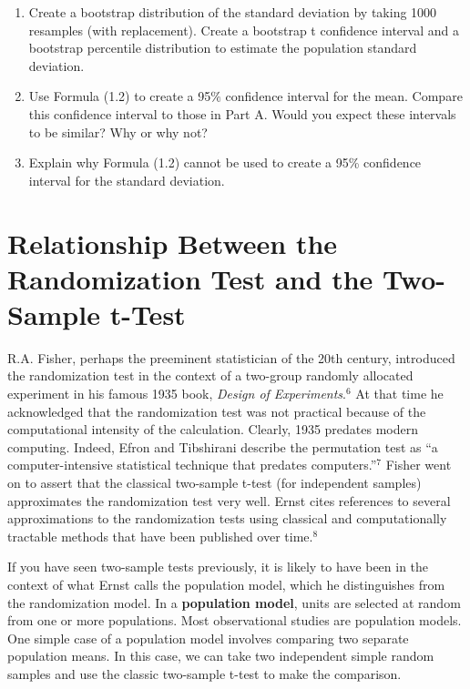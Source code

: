\documentclass[
]{book}
\providecommand{\tightlist}{%
  \setlength{\itemsep}{0pt}\setlength{\parskip}{0pt}}
\begin{document}
\begin{enumerate}
\def\labelenumi{\alph{enumi}.}
\tightlist
\item
  Create a bootstrap distribution of the standard deviation by taking 1000 resamples (with replacement). Create a bootstrap t confidence interval and a bootstrap percentile distribution to estimate the population standard deviation.
\item
  Use Formula (1.2) to create a 95\(\%\) confidence interval for the mean. Compare this confidence interval to those in Part A. Would you expect these intervals to be similar? Why or why not?
\item
  Explain why Formula (1.2) cannot be used to create a 95\% confidence interval for the standard deviation.
\end{enumerate}

\hypertarget{relationship-between-the-randomization-test-and-the-two-sample-t-test}{%
\section{Relationship Between the Randomization Test and the Two-Sample t-Test}\label{relationship-between-the-randomization-test-and-the-two-sample-t-test}}

R.A. Fisher, perhaps the preeminent statistician of the 20th century, introduced the randomization test in the context of a two-group randomly allocated experiment in his famous 1935 book, \emph{Design of Experiments}.\(^6\) At that time he acknowledged that the randomization test was not practical because of the computational
intensity of the calculation. Clearly, 1935 predates modern computing. Indeed, Efron and Tibshirani describe the permutation test as ``a computer-intensive statistical technique that predates computers.''\(^7\) Fisher went on to assert that the classical two-sample t-test (for independent samples) approximates the randomization test very well. Ernst cites references to several approximations to the randomization tests using classical and computationally tractable methods that have been published over time.\(^8\)

If you have seen two-sample tests previously, it is likely to have been in the context of what Ernst calls the population model, which he distinguishes from the randomization model. In a \textbf{population model}, units are selected at random from one or more populations. Most observational studies are population models. One simple case of a population model involves comparing two separate population means. In this case, we can take two independent simple random samples and use the classic two-sample t-test to make the comparison.
\end{document}
